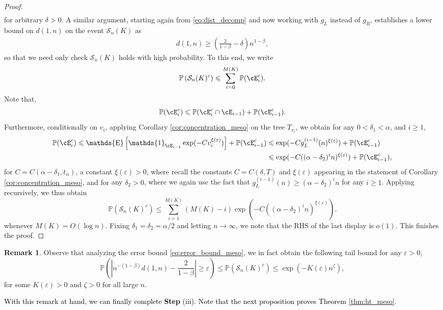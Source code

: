 \documentclass[letterpaper,11pt,reqno]{amsart}
\theoremstyle{definition}
\newtheorem{rem}[thm]{Remark}
\renewcommand{\leq}{\leqslant}
\renewcommand{\geq}{\geqslant}
\newcommand{\ind}{\mathds{1}}
\newcommand{\eps}{\varepsilon}
\newcommand{\cS}{\mathcal{S}}\newcommand{\cT}{\mathcal{T}}\newcommand{\cU}{\mathcal{U}}
\DeclareMathOperator{\E}{\mathds{E}}
\DeclareMathOperator{\pr}{\mathds{P}}
\newcommand{\prob}{\mathbb{P}}
\begin{document}
\begin{proof}
\begin{align*}
\end{align*}
for arbitrary $\delta>0$. A similar argument, starting again from \eqref{eq:dist_decomp} and now working with $g_L$ instead of $g_R$, establishes a lower bound on $d(1,n)$ on the event $\cS_n(K)$ as 
\begin{align*}
    d(1,n)\geq \left(\frac{2}{1-\beta}-\delta \right)n^{1-\beta},
\end{align*}%
so that we need only check $\cS_n(K)$ holds with high probability. To this end, we write
\begin{align*}
    \prob\left(\cS_n(K)^c \right) \leq \sum_{i=0}^{M(K)} \prob(\cE_i^c).
\end{align*}
Note that,
\begin{align*}
    \prob(\cE_i^c)\leq \prob(\cE_i^c \cap \cE_{i-1})+\prob(\cE_{i-1}^c).
\end{align*}
Furthermore, conditionally on $v_i$, applying Corollary \ref{cor:concentration_meso} on the tree $T_{v_i}$, we obtain for any $0<\delta_1<\alpha$, and $i \geq 1$,
\begin{align*}
    \prob(\cE_i^c)\leq \E\left[\ind_{\cE_{i-1}}\exp(-Cv_i^{\xi(\eps)}) \right]+\prob(\cE_{i-1}^c)& \leq \exp(-Cg_L^{(i-1)}(n)^{\xi(\eps)})+\prob(\cE_{i-1}^c)\\& \leq \exp(-C((\alpha-\delta_2)^in)^{\xi(\eps)})+\prob(\cE_{i-1}^c), 
\end{align*}
{for $C=C(\alpha-\delta_1,t_{\alpha})$, a constant $\xi(\eps)>0$, where recall the constants $C=C(\delta,T)$ and $\xi(\eps)$ appearing in the statement of Corollary \ref{cor:concentration_meso}, and for} any $\delta_2>0$, where we again use the fact that $g_L^{(i-1)}(n)\geq (\alpha-\delta_2)^i n$ for any $i \geq 1$.  Applying recursively, we thus obtain
\begin{equation}\label{eq:error_bound_meso}
    \prob(\cS_n(K)^c)\leq \sum_{i=1}^{M(K)}(M(K)-i)\exp(-C((\alpha-\delta_2)^in)^{\xi(\eps)}).
\end{equation}
whenever $M(K)=O(\log n)$. Fixing $\delta_1=\delta_2=\alpha/2$ and letting $n \to \infty$, we note that the RHS of the last display is $o(1)$. This finishes the proof.
\end{proof}

\begin{rem}\label{rem:dist_tail_bound}
    Observe that analyzing the error bound \eqref{eq:error_bound_meso}, we in fact obtain the following tail bound for any $\eps>0$,
    \begin{equation}\label{eq:dist_tail_bound}
        \prob\left(\left|n^{-(1-\beta)}d(1,n)-\frac{2}{1-\beta}\right|\geq \eps\right)\leq \prob(\cS_n(K)^c)\leq \exp\left(-K(\eps)n^{\zeta} \right),
    \end{equation}
    for some $K(\eps)>0$ and $\zeta>0$ for all large $n$.
\end{rem}
\textcolor{black}{With this remark at hand, we can finally complete \textbf{Step} (iii). Note that the next proposition proves Theorem \ref{thm:ht_meso}.}
\end{document}
